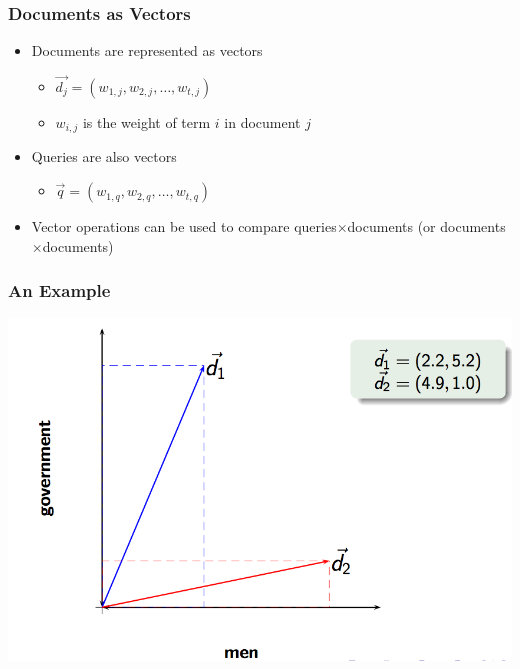 \documentclass[svgnames]{beamer}
\newcommand{\wij}{\ensuremath{w_{i,j}}}
\begin{document}
\begin{frame} \frametitle{Documents as Vectors}

  \begin{block}{}
    \begin{itemize}
    \item Documents are represented as vectors
      \begin{itemize}
      \item $\vec{d_j} = (w_{1,j}, w_{2,j}, \ldots, w_{t,j})$
      \item $\wij$ is the weight of term $i$ in document $j$
      \end{itemize}
    \item Queries are also vectors
      \begin{itemize}
      \item $\vec{q} = (w_{1,q}, w_{2,q}, \ldots, w_{t,q})$
      \end{itemize}
    \item Vector operations can be used to compare queries$\times$documents (or
      documents$\times$documents)
    \end{itemize}
  \end{block}

\end{frame}





\begin{frame}
  \frametitle{An Example}

  \begin{center}
    \includegraphics[width=.8\linewidth]{VSM-vectores.png}\\
  \end{center}

\end{frame}
\end{document}
